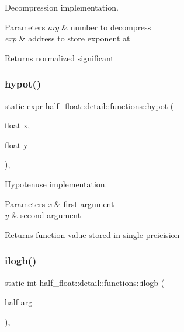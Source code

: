Decompression implementation. 
\begin{DoxyParams}{Parameters}
{\em arg} & number to decompress \\
\hline
{\em exp} & address to store exponent at \\
\hline
\end{DoxyParams}
\begin{DoxyReturn}{Returns}
normalized significant 
\end{DoxyReturn}
\mbox{\label{structhalf__float_1_1detail_1_1functions_a1ea6c3b5f49e742b82828c69c755210c}} 
\subsubsection{\texorpdfstring{hypot()}{hypot()}}
{\footnotesize\ttfamily static \hyperlink{structhalf__float_1_1detail_1_1expr}{expr} half\+\_\+float\+::detail\+::functions\+::hypot (\begin{DoxyParamCaption}\item[{float}]{x,  }\item[{float}]{y }\end{DoxyParamCaption})\hspace{0.3cm}{\ttfamily [inline]}, {\ttfamily [static]}}

Hypotenuse implementation. 
\begin{DoxyParams}{Parameters}
{\em x} & first argument \\
\hline
{\em y} & second argument \\
\hline
\end{DoxyParams}
\begin{DoxyReturn}{Returns}
function value stored in single-\/preicision 
\end{DoxyReturn}
\mbox{\label{structhalf__float_1_1detail_1_1functions_a06cd09aa623a569dd547c143bc19b972}} 
\subsubsection{\texorpdfstring{ilogb()}{ilogb()}}
{\footnotesize\ttfamily static int half\+\_\+float\+::detail\+::functions\+::ilogb (\begin{DoxyParamCaption}\item[{\hyperlink{classhalf__float_1_1half}{half}}]{arg }\end{DoxyParamCaption})\hspace{0.3cm}{\ttfamily [inline]}, {\ttfamily [static]}}

